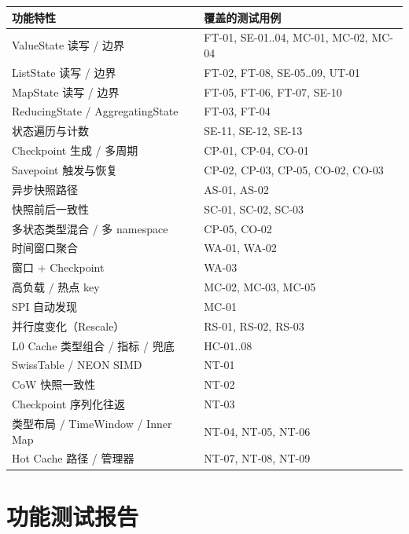 \documentclass[a4paper,11pt]{article}
\begin{document}
\begin{table}[H]
\centering
\small
\begin{tabularx}{\textwidth}{L{5.0cm} X}
\toprule
\textbf{功能特性} & \textbf{覆盖的测试用例} \\
\midrule
ValueState 读写 / 边界                & FT-01, SE-01..04, MC-01, MC-02, MC-04 \\
ListState 读写 / 边界                 & FT-02, FT-08, SE-05..09, UT-01 \\
MapState 读写 / 边界                  & FT-05, FT-06, FT-07, SE-10 \\
ReducingState / AggregatingState      & FT-03, FT-04 \\
状态遍历与计数                        & SE-11, SE-12, SE-13 \\
Checkpoint 生成 / 多周期              & CP-01, CP-04, CO-01 \\
Savepoint 触发与恢复                  & CP-02, CP-03, CP-05, CO-02, CO-03 \\
异步快照路径                          & AS-01, AS-02 \\
快照前后一致性                        & SC-01, SC-02, SC-03 \\
多状态类型混合 / 多 namespace         & CP-05, CO-02 \\
时间窗口聚合                          & WA-01, WA-02 \\
窗口 + Checkpoint                    & WA-03 \\
高负载 / 热点 key                     & MC-02, MC-03, MC-05 \\
SPI 自动发现                          & MC-01 \\
并行度变化（Rescale）                 & RS-01, RS-02, RS-03 \\
L0 Cache 类型组合 / 指标 / 兜底       & HC-01..08 \\
SwissTable / NEON SIMD                & NT-01 \\
CoW 快照一致性                        & NT-02 \\
Checkpoint 序列化往返                 & NT-03 \\
类型布局 / TimeWindow / Inner Map     & NT-04, NT-05, NT-06 \\
Hot Cache 路径 / 管理器               & NT-07, NT-08, NT-09 \\
\bottomrule
\end{tabularx}
\end{table}

\section{功能测试报告}
\end{document}
